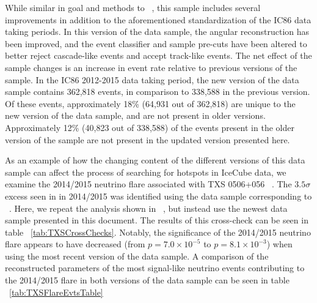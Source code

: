 \documentclass[aps,10pt,prd,twocolumn,floats,letterpaper,showpacs,nofootinbib,bibnotes,notitlepage,superscriptaddress,floatfix]{revtex4-1}
\begin{document}
While similar in goal and methods to ~\cite{IceCube:2019}, this sample includes several improvements in addition to the aforementioned standardization of the IC86 data taking periods. In this version of the data sample, the angular reconstruction has been improved, and the event classifier and sample pre-cuts have been altered to better reject cascade-like events and accept track-like events. The net effect of the sample changes is an increase in event rate relative to previous versions of the sample. In the IC86 2012-2015 data taking period, the new version of the data sample contains 362,818 events, in comparison to 338,588 in the previous version. Of these events, approximately 18\% (64,931 out of 362,818) are unique to the new version of the data sample, and are not present in older versions. Approximately 12\% (40,823 out of 338,588) of the events present in the older version of the sample are not present in the updated version presented here. 

As an example of how the changing content of the different versions of this data sample can affect the process of searching for hotspots in IceCube data, we examine the 2014/2015 neutrino flare associated with TXS 0506+056 ~\cite{IceCube:2018cha}. The $3.5 \sigma$ excess seen in in 2014/2015 was identified using the data sample corresponding to ~\cite{IceCube:2019}. Here, we repeat the analysis shown in ~\cite{IceCube:2018cha}, but instead use the newest data sample presented in this document. The results of this cross-check can be seen in table ~\ref{tab:TXSCrossChecks}. Notably, the significance of the 2014/2015 neutrino flare appears to have decreased (from $p=7.0 \times 10^{-5}$ to $p=8.1 \times 10^{-3}$) when using the most recent version of the data sample. A comparison of the reconstructed parameters of the most signal-like neutrino events contributing to the 2014/2015 flare in both versions of the data sample can be seen in table ~\ref{tab:TXSFlareEvtsTable}
\end{document}
